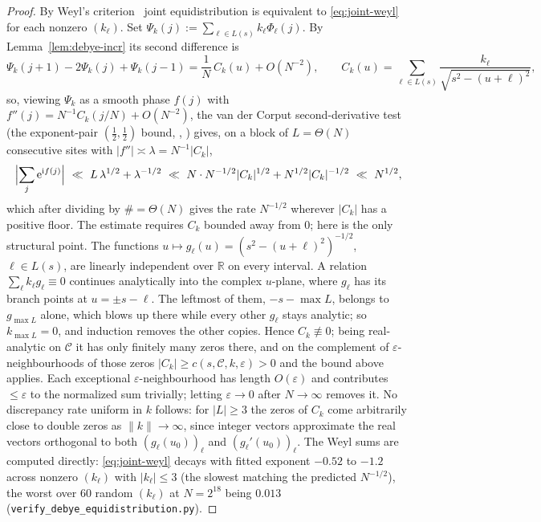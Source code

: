 \begin{proof}
By Weyl's criterion~\cite{Weyl}\cite[Ch.~1]{KN} joint equidistribution is equivalent to \eqref{eq:joint-weyl}
for each nonzero $(k_\ell)$. Set $\Psi_k(j):=\sum_{\ell\in L(s)}k_\ell\Phi_\ell(j)$. By Lemma~\ref{lem:debye-incr} its
second difference is
\[
  \Psi_k(j+1)-2\Psi_k(j)+\Psi_k(j-1)=\frac1N\,C_k(u)+O(N^{-2}),\qquad
  C_k(u)=\sum_{\ell\in L(s)}\frac{k_\ell}{\sqrt{s^2-(u+\ell)^2}} ,
\]
so, viewing $\Psi_k$ as a smooth phase $f(j)$ with $f''(j)=N^{-1}C_k(j/N)+O(N^{-2})$, the van der Corput
second-derivative test (the exponent-pair $(\tfrac12,\tfrac12)$ bound, \cite[Ch.~3]{Montgomery},
\cite[Ch.~2]{GrahamKolesnik}) gives, on a block of $L=\Theta(N)$ consecutive sites with
$|f''|\asymp\lambda=N^{-1}|C_k|$,
\[
  \Bigl|\sum_{j} \eu^{\mathrm i f(j)}\Bigr|\ \ll\ L\,\lambda^{1/2}+\lambda^{-1/2}
   \ \ll\ N\cdot N^{-1/2}|C_k|^{1/2}+N^{1/2}|C_k|^{-1/2}\ \ll\ N^{1/2},
\]
which after dividing by $\#=\Theta(N)$ gives the rate $N^{-1/2}$ wherever $|C_k|$ has a positive floor. The
estimate requires $C_k$ bounded away from $0$; here is the only structural point. The functions
$u\mapsto g_\ell(u)=(s^2-(u+\ell)^2)^{-1/2}$, $\ell\in L(s)$, are linearly independent over $\mathbb R$ on every
interval. A relation $\sum_\ell k_\ell g_\ell\equiv0$ continues analytically into the complex $u$-plane, where
$g_\ell$ has its branch points at $u=\pm s-\ell$. The leftmost of them, $-s-\max L$, belongs to $g_{\max L}$
alone, which blows up there while every other $g_\ell$ stays analytic; so $k_{\max L}=0$, and induction removes
the other copies. Hence $C_k\not\equiv0$; being
real-analytic on $\mathcal C$ it has only finitely many zeros there, and on the complement of
$\varepsilon$-neighbourhoods of those zeros $|C_k|\ge c(s,\mathcal C,k,\varepsilon)>0$ and the bound above
applies. Each exceptional $\varepsilon$-neighbourhood has length $O(\varepsilon)$ and contributes
$\le\varepsilon$ to the normalized sum trivially; letting $\varepsilon\to0$ after $N\to\infty$ removes it. No discrepancy rate uniform in $k$ follows: for $|L|\ge3$ the zeros of $C_k$ come arbitrarily close to
double zeros as $\|k\|\to\infty$, since integer vectors approximate the real vectors orthogonal to both
$(g_\ell(u_0))_\ell$ and $(g_\ell'(u_0))_\ell$. The Weyl sums
are computed directly: \eqref{eq:joint-weyl} decays with fitted exponent $-0.52$ to $-1.2$ across nonzero
$(k_\ell)$ with $|k_\ell|\le3$ (the slowest matching the predicted $N^{-1/2}$), the worst over $60$ random
$(k_\ell)$ at $N=2^{18}$ being $0.013$ (\texttt{verify\_debye\_equidistribution.py}).
\end{proof}

